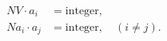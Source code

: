 \begin{equation}
\begin{split}
 N V \cdot a_i &= \mbox{integer}, \\
 N a_i \cdot a_j &= \mbox{integer}, \quad (i \ne j).
\end{split}
\end{equation}

